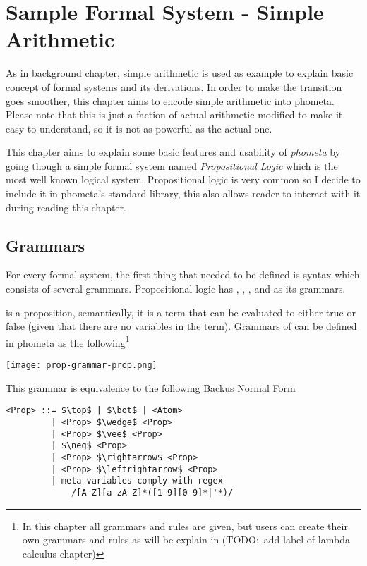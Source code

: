 \documentclass[master.tex]{subfiles}
\begin{document}
\chapter{Sample Formal System - Simple Arithmetic}
\label{chap:example_simple_arithmetic}

As in \hyperref[chap:background]{background chapter}, simple arithmetic is
used as example to explain basic concept of formal systems and its derivations.
In order to make the transition goes smoother, this chapter aims to encode
simple arithmetic into phometa. Please note that this is just a faction of
actual arithmetic modified to make it easy to understand, so it is not as
powerful as the actual one.

This chapter aims to explain some basic features and usability of \emph{phometa}
by going though a simple formal system named \emph{Propositional Logic} which is
the most well known logical system. Propositional logic is very common so I
decide to include it in phometa's standard library, this also allows reader to
interact with it during reading this chapter.

\section{Grammars}

For every formal system, the first thing that needed to be defined is syntax
which consists of several grammars. Propositional logic has ,
, , and  as its grammars.

 is a proposition, semantically, it is a term that can be evaluated
to either true or false (given that there are no variables in the term).
Grammars of  can be defined in phometa as the following\footnote{In
  this chapter all grammars and rules are given, but users can create their own
  grammars and rules as will be explain in
  (TODO:\ add label of lambda
  calculus chapter)}

\centerline{\texttt{[image: prop-grammar-prop.png]}}

This grammar is equivalence to the following Backus Normal Form
\begin{lstlisting}[style=bnf]
<Prop> ::= $\top$ | $\bot$ | <Atom>
         | <Prop> $\wedge$ <Prop>
         | <Prop> $\vee$ <Prop>
         | $\neg$ <Prop>
         | <Prop> $\rightarrow$ <Prop>
         | <Prop> $\leftrightarrow$ <Prop>
         | meta-variables comply with regex
             /[A-Z][a-zA-Z]*([1-9][0-9]*|'*)/
\end{lstlisting}
\end{document}
